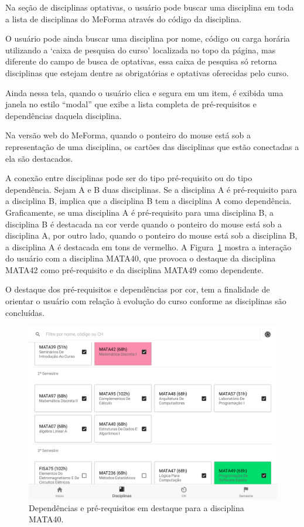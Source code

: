 Na seção de disciplinas optativas, o usuário pode buscar uma disciplina em toda a lista de disciplinas do MeForma através do código da disciplina.

O usuário pode ainda buscar uma disciplina por nome, código ou carga horária utilizando a ‘caixa de pesquisa do curso’ localizada no topo da página, mas diferente do campo de busca de optativas, essa caixa de pesquisa só retorna disciplinas que estejam dentre as obrigatórias e optativas oferecidas pelo curso.

Ainda nessa tela, quando o usuário clica e segura em um item, é exibida uma janela no estilo “modal” que exibe a lista completa de pré-requisitos e dependências daquela disciplina.

Na versão web do MeForma, quando o ponteiro do mouse está sob a representação de uma disciplina, os cartões das disciplinas que estão conectadas a ela são destacados. 

A conexão entre disciplinas pode ser do tipo pré-requisito ou do tipo dependência. Sejam A e B duas disciplinas. Se a disciplina A é pré-requisito para a disciplina B, implica que a disciplina B tem a disciplina A como dependência. Graficamente, se uma disciplina A é pré-requisito para uma disciplina B, a disciplina B é destacada na cor verde quando o ponteiro do mouse está sob a disciplina A, por outro lado, quando o ponteiro do mouse está sob a disciplina B, a disciplina A é destacada em tons de vermelho. A Figura~\ref{highlight} mostra a interação do usuário com a disciplina MATA40, que provoca o destaque da disciplina MATA42 como pré-requisito e da disciplina MATA49 como dependente.

O destaque dos pré-requisitos e dependências por cor, tem a finalidade de orientar o usuário com relação à evolução do curso conforme as disciplinas são concluídas.

\begin{figure}[H]
	   \centering
	   		\includegraphics[scale=0.25]{pics/c3/7-highlight.png}
	   \caption{Dependências e pré-requisitos em destaque para a disciplina MATA40.}
	   \label{highlight}
\end{figure}
